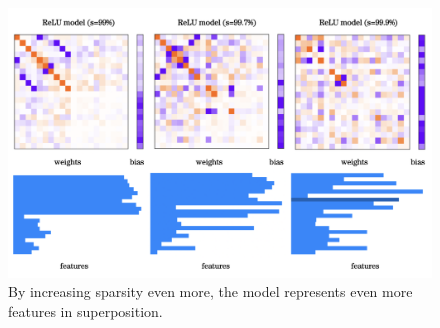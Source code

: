 \documentclass{article} %
\begin{document}
\begin{figure}[h]
    \centering
    \includegraphics[width=0.85\linewidth]{demonstrating_superposition/images/sparsity_superposition2.png}
    \captionsetup{font=footnotesize, width=0.7\linewidth} %
    \caption{
        By increasing sparsity even more, the model represents even more
        features in superposition.
    }
    \label{fig:sparsity_2}
\end{figure}



\end{document}
